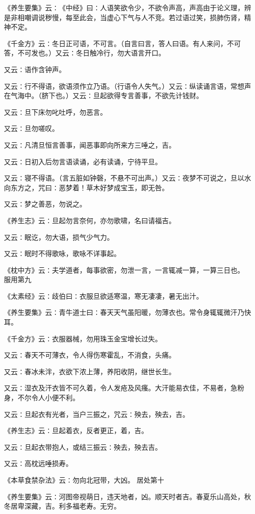 \documentclass[a4paper,12pt,UTF8,twoside]{ctexbook}
\begin{document}
《养生要集》云∶《中经》曰∶人语笑欲令少，不欲令声高，声高由于论义理，辨是非相嘲调说秽慢，每至此会，当虚心下气与人不竞。若过语过笑，损肺伤肾，精神不定。

《千金方》云∶冬日正可语，不可言。（自言曰言，答人曰语。有人来问，不可答，不可发也。）又云∶冬日触冷行，勿大语言开口。

又云∶语作含钟声。

又云∶行不得语，欲语须作立乃语。（行语令人失气。）又云∶纵读诵言语，常想声在气海中。（脐下也。）又云∶旦起欲得专言善事，不欲先计钱财。

又云∶旦下床勿叱吐呼，勿恶言。

又云∶旦勿嗟叹。

又云∶凡清旦恒言善事，闻恶事即向所来方三唾之，吉。

又云∶日初入后勿言语读诵，必有读诵，宁待平旦。

又云∶寝不得语。（言五脏如钟磬，不悬不可出声。）又云∶夜梦不可说之，旦以水向东方之，咒曰∶恶梦着！草木好梦成宝玉，即无咎。

又云∶梦之善恶，勿说之。

《养生志》云∶旦起勿言奈何，亦勿歌啸，名曰请福吉。

又云∶眠讫，勿大语，损气少气力。

又云∶眠时不得歌咏，歌咏不详事起。

《枕中方》云∶夫学道者，每事欲密，勿泄一言，一言辄减一算，一算三日也。
服用第九

《太素经》云∶歧伯曰∶衣服旦欲适寒温，寒无凄凄，暑无出汁。

《养生要集》云∶青牛道士曰∶春天天气虽阳暖，勿薄衣也。常令身辄辄微汗乃快耳。

《千金方》云∶衣服器械，勿用珠玉金宝增长过失。

又云∶春天不可薄衣，令人得伤寒霍乱，不消食，头痛。

又云∶春冰未泮，衣欲下浓上薄，养阳收阴，继世长生。

又云∶湿衣及汗衣皆不可久着，令人发疮及风瘙。大汗能易衣佳，不易者，急粉身，不尔令人小便不利。

又云∶旦起衣有光者，当户三振之，咒云∶殃去，殃去，吉。

《养生志》云∶旦起着衣，反者更正，着，吉。

又云∶旦起衣带抱人，或结三振云∶殃去，殃去吉。

又云∶高枕远唾损寿。

《本草食禁杂法》云∶勿向北冠带，大凶。
居处第十

《养生要集》云∶河图帝视萌日，违天地者，凶。顺天时者吉。春夏乐山高处，秋冬居卑深藏，吉。利多福老寿。无穷。
\end{document}
